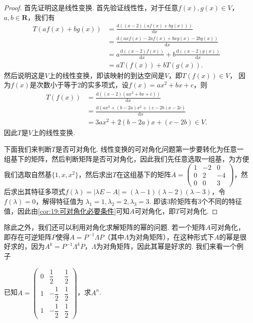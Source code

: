 \begin{proof}
    首先证明这是线性变换. 首先验证线性性，对于任意$f(x),g(x)\in V$，$a,b\in\mathbf{R}$，我们有
    \begin{align*}
        T(af(x)+bg(x)) & =\frac{\mathrm{d}((x-2)(af(x)+bg(x)))}{\mathrm{d}x} \\
                       & =\frac{\mathrm{d}(axf(x)-2af(x)+bxg(x)-2bg(x))}{\mathrm{d}x} \\
                       & =a\frac{\mathrm{d}((x-2)f(x))}{\mathrm{d}x}+b\frac{\mathrm{d}((x-2)g(x))}{\mathrm{d}x} \\
                       & =aT(f(x))+bT(g(x)).
    \end{align*}
    然后说明这是$V$上的线性变换，即该映射的到达空间是$V$，即$T(f(x))\in V$， 因为$f(x)$是次数小于等于2的实多项式，设$f(x)=ax^2+bx+c$，则
    \begin{align*}
        T(f(x)) & =\frac{\mathrm{d}((x-2)(ax^2+bx+c))}{\mathrm{d}x} \\
                & =\frac{\mathrm{d}(ax^3+(b-2a)x^2+(c-2b)x-2c)}{\mathrm{d}x} \\
                & =3ax^2+2(b-2a)x+(c-2b)\in V.
    \end{align*}
    因此$T$是$V$上的线性变换.

    下面我们来判断$T$是否可对角化. 线性变换的可对角化问题第一步要转化为任意一组基下的矩阵，然后判断矩阵是否可对角化，因此我们先任意选取一组基，为方便我们选取自然基$\{1,x,x^2\}$，然后求出$T$在这组基下的矩阵$A=\begin{pmatrix}
        1 & -2 & 0 \\ 0 & 2 & -4 \\ 0 & 0 & 3
    \end{pmatrix}$，然后求出其特征多项式$f(\lambda)=|\lambda E-A|=(\lambda-1)(\lambda-2)(\lambda-3)$，令$f(\lambda)=0$，解得特征值为 $\lambda_1=1,\lambda_2=2,\lambda_3=3$. 即该3阶矩阵有3个不同的特征值，因此由\autoref{cor:19:可对角化必要条件}可知$A$可对角化，即$T$可对角化.
\end{proof}

除此之外，我们还可以利用对角化求解矩阵的幂的问题. 若一个矩阵$A$可对角化，即存在可逆矩阵$P$使得$A=P^{-1}\varLambda P$（其中$\varLambda$为对角矩阵），在这种形式下$A$的幂是很好求的，因为$A^k=P^{-1}\varLambda^kP$，$\varLambda$为对角矩阵，因此其幂是好求的. 我们来看一个例子
\begin{example}
    已知$A=\begin{pmatrix}
            0 & \dfrac{1}{2}  & \dfrac{1}{2} \\[2ex]
            1 & -\dfrac{1}{2} & \dfrac{1}{2} \\[2ex]
            1 & -\dfrac{1}{2} & \dfrac{1}{2}
        \end{pmatrix}$，求$A^n$.
\end{example}

